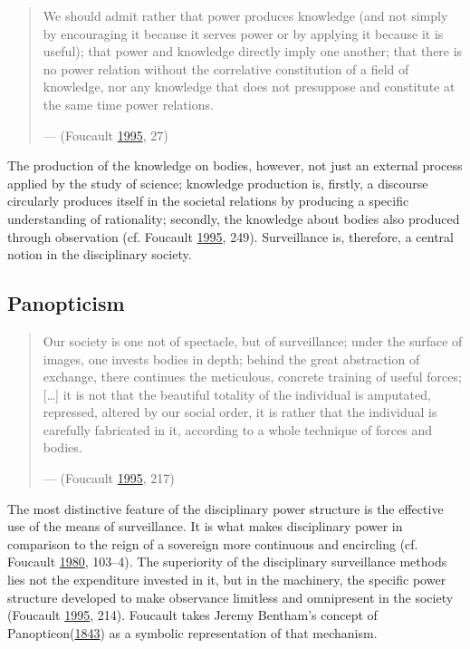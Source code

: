 \documentclass[12pt,twoside]{report}
\begin{document}
\begin{quote}
We should admit rather that power produces knowledge (and not simply by encouraging it because it serves power or by applying it because it is useful); that power and knowledge directly imply one another; that there is no power relation without the correlative constitution of a field of knowledge, nor any knowledge that does not presuppose and constitute at the same time power relations.

--- (Foucault \protect\hyperlink{ref-Foucault1995}{1995}, 27)
\end{quote}

The production of the knowledge on bodies, however, not just an external process applied by the study of science; knowledge production is, firstly, a discourse circularly produces itself in the societal relations by producing a specific understanding of rationality; secondly, the knowledge about bodies also produced through observation (cf. Foucault \protect\hyperlink{ref-Foucault1995}{1995}, 249). Surveillance is, therefore, a central notion in the disciplinary society.

\hypertarget{panopticism}{%
\subsection{Panopticism}\label{panopticism}}

\begin{quote}
Our society is one not of spectacle, but of surveillance; under the surface of images, one invests bodies in depth; behind the great abstraction of exchange, there continues the meticulous, concrete training of useful forces; {[}\ldots{}{]} it is not that the beautiful totality of the individual is amputated, repressed, altered by our social order, it is rather that the individual is carefully fabricated in it, according to a whole technique of forces and bodies.

--- (Foucault \protect\hyperlink{ref-Foucault1995}{1995}, 217)
\end{quote}

The most distinctive feature of the disciplinary power structure is the effective use of the means of surveillance. It is what makes disciplinary power in comparison to the reign of a sovereign more continuous and encircling (cf. Foucault \protect\hyperlink{ref-Foucault1980}{1980}, 103--4). The superiority of the disciplinary surveillance methods lies not the expenditure invested in it, but in the machinery, the specific power structure developed to make observance limitless and omnipresent in the society (Foucault \protect\hyperlink{ref-Foucault1995}{1995}, 214). Foucault takes Jeremy Bentham's concept of Panopticon(\protect\hyperlink{ref-Bentham1843}{1843}) as a symbolic representation of that mechanism.
\end{document}
